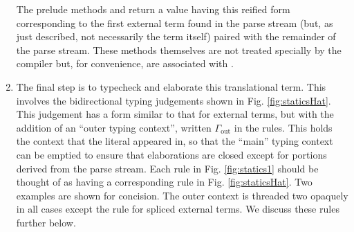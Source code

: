 \begin{enumerate}
The prelude methods  and  return a value having this reified form corresponding to the first external term found in the parse stream (but, as just described, not necessarily the term itself) paired with the remainder of the parse stream. These methods themselves are not treated specially by the compiler but, for convenience, are associated with  .
\item The final step is to typecheck and elaborate this translational term. This involves the bidirectional typing judgements shown in Fig. \ref{fig:staticsHat}. This judgement has a form similar to that for external terms, but with the addition of an ``outer typing context'', written $\Gamma_{\text{out}}$ in the rules. This holds the context that the literal appeared in, so that the ``main'' typing context can be emptied to ensure that elaborations are closed except for portions derived from the parse stream. 
Each rule in Fig. \ref{fig:statics1} should be thought of as having a corresponding rule in Fig. \ref{fig:staticsHat}. Two examples are shown for concision. The outer context is threaded two opaquely in all cases except the rule for spliced external terms. We discuss these rules further below.
\end{enumerate}

